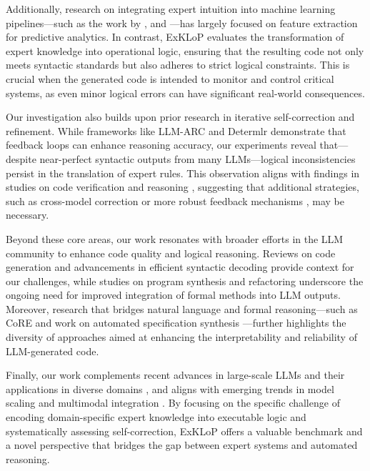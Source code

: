 Additionally, research on integrating expert intuition into machine learning pipelines—such as the work by \cite{bogatu2023meta}, \cite{jing2024translating} and \cite{boicu2001automatic}—has largely focused on feature extraction for predictive analytics. In contrast, ExKLoP evaluates the transformation of expert knowledge into operational logic, ensuring that the resulting code not only meets syntactic standards but also adheres to strict logical constraints. This is crucial when the generated code is intended to monitor and control critical systems, as even minor logical errors can have significant real-world consequences.

Our investigation also builds upon prior research in iterative self-correction and refinement. While frameworks like LLM-ARC \cite{kalyanpur2024llm} and Determlr \cite{sun2024determlr} demonstrate that feedback loops can enhance reasoning accuracy, our experiments reveal that—despite near-perfect syntactic outputs from many LLMs—logical inconsistencies persist in the translation of expert rules. This observation aligns with findings in studies on code verification and reasoning \cite{wu2023lemur, feng2023language, feng2024language, chen2022program}, suggesting that additional strategies, such as cross-model correction \cite{li2024leveraging} or more robust feedback mechanisms \cite{yang2024enhancing}, may be necessary.

Beyond these core areas, our work resonates with broader efforts in the LLM community to enhance code quality and logical reasoning. Reviews on code generation \cite{wang2023review} and advancements in efficient syntactic decoding \cite{ugare2024improving} provide context for our challenges, while studies on program synthesis and refactoring \cite{zhang2024refactoring, lyu2024automatic} underscore the ongoing need for improved integration of formal methods into LLM outputs. Moreover, research that bridges natural language and formal reasoning—such as CoRE \cite{xu2024core} and work on automated specification synthesis \cite{wen2024enchanting}—further highlights the diversity of approaches aimed at enhancing the interpretability and reliability of LLM-generated code.

Finally, our work complements recent advances in large-scale LLMs and their applications in diverse domains \cite{clark2020transformers, wang2019logic, yang2024if, nejjar2025llms, chu2024think, wysocka2024large, wysocki2024llm, delmas-etal-2024-relation, wysocki2023transformers}, and aligns with emerging trends in model scaling and multimodal integration \cite{grattafiori2024llama3herdmodels, jiang2024mixtralexperts, jiang2023mistral7b, yang2024qwen2technicalreport, gemmateam2024gemmaopenmodelsbased}. By focusing on the specific challenge of encoding domain-specific expert knowledge into executable logic and systematically assessing self-correction, ExKLoP offers a valuable benchmark and a novel perspective that bridges the gap between expert systems and automated reasoning.

